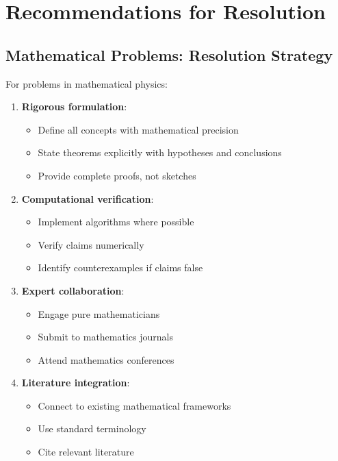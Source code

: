 \section{Recommendations for Resolution}

\subsection{Mathematical Problems: Resolution Strategy}

For problems in mathematical physics:

\begin{enumerate}
    \item \textbf{Rigorous formulation}:
    \begin{itemize}
        \item Define all concepts with mathematical precision
        \item State theorems explicitly with hypotheses and conclusions
        \item Provide complete proofs, not sketches
    \end{itemize}

    \item \textbf{Computational verification}:
    \begin{itemize}
        \item Implement algorithms where possible
        \item Verify claims numerically
        \item Identify counterexamples if claims false
    \end{itemize}

    \item \textbf{Expert collaboration}:
    \begin{itemize}
        \item Engage pure mathematicians
        \item Submit to mathematics journals
        \item Attend mathematics conferences
    \end{itemize}

    \item \textbf{Literature integration}:
    \begin{itemize}
        \item Connect to existing mathematical frameworks
        \item Use standard terminology
        \item Cite relevant literature
    \end{itemize}
\end{enumerate}

